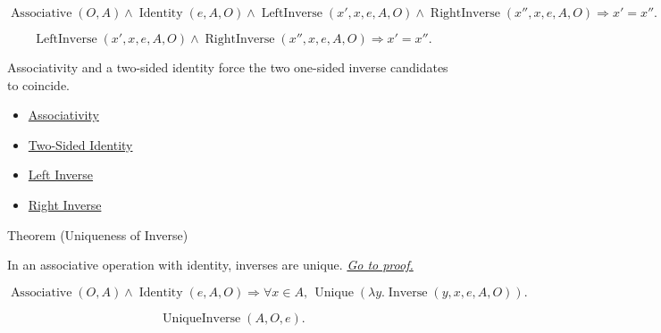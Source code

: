\begin{remark*}
\[
\operatorname{Associative}(O,A)
\land
\operatorname{Identity}(e,A,O)
\land
\operatorname{LeftInverse}(x',x,e,A,O)
\land
\operatorname{RightInverse}(x'',x,e,A,O)
\Longrightarrow x'=x''.
\]
\end{remark*}

\begin{remark*}
\[
\operatorname{LeftInverse}(x',x,e,A,O)
\land
\operatorname{RightInverse}(x'',x,e,A,O)
\Longrightarrow x'=x''.
\]
\end{remark*}

\begin{remark*}[Interpretation]
Associativity and a two-sided identity force the two one-sided inverse
candidates to coincide.
\end{remark*}

\begin{dependencies}
\begin{itemize}
  \item \hyperref[def:associativity]{Associativity}
  \item \hyperref[def:two-sided-identity]{Two-Sided Identity}
  \item \hyperref[def:left-inverse]{Left Inverse}
  \item \hyperref[def:right-inverse]{Right Inverse}
\end{itemize}
\end{dependencies}

\begin{theorembox}{Theorem (Uniqueness of Inverse)}
\begin{theorem}
\label{thm:uniqueness-of-inverse}
In an associative operation with identity, inverses are unique.
\hyperref[prf:uniqueness-of-inverse]{\textit{Go to proof.}}
\end{theorem}
\end{theorembox}

\begin{remark*}
\[
\operatorname{Associative}(O,A)
\land
\operatorname{Identity}(e,A,O)
\Longrightarrow
\forall x\in A,\,
\operatorname{Unique}(\lambda y.\operatorname{Inverse}(y,x,e,A,O)).
\]
\end{remark*}

\begin{remark*}
\[
\operatorname{UniqueInverse}(A,O,e).
\]
\end{remark*}

